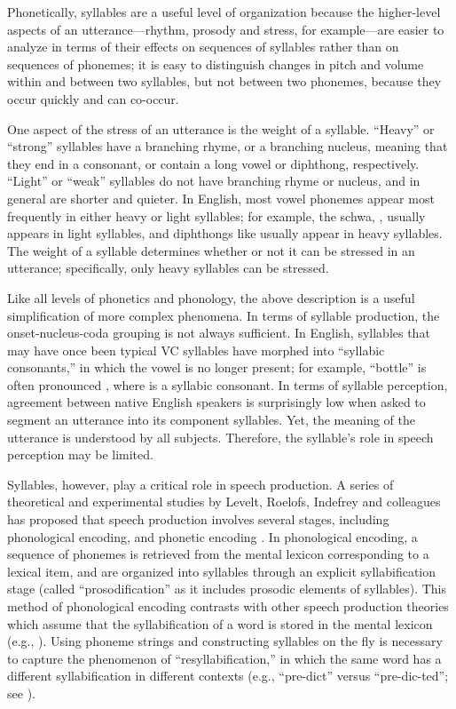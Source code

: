Phonetically, syllables are a useful
level of organization because
the higher-level aspects
of an utterance---rhythm, prosody and stress,
for example---are easier to analyze
in terms of their effects on
sequences of syllables rather than
on sequences of phonemes;
it is easy to distinguish
changes in pitch and volume
within and between two syllables,
but not between two phonemes,
because they occur quickly
and can co-occur.

One aspect of the stress of an utterance
is the weight of a syllable.
``Heavy'' or ``strong'' syllables
have a branching rhyme,
or a branching nucleus,
meaning that they
end in a consonant,
or contain a long vowel or diphthong,
respectively.
``Light'' or ``weak'' syllables
do not have branching rhyme or nucleus,
and in general are shorter
and quieter.
In English, most vowel phonemes
appear most frequently in either
heavy or light syllables;
for example, the schwa, \ipa{[@]},
usually appears in light syllables,
and diphthongs like \ipa{[aU]}
usually appear in heavy syllables.
The weight of a syllable determines
whether or not it can be stressed
in an utterance;
specifically, only heavy syllables
can be stressed.

Like all levels of phonetics and phonology,
the above description is a useful simplification
of more complex phenomena.
In terms of syllable production,
the onset-nucleus-coda grouping
is not always sufficient.
In English, syllables that may have once
been typical VC syllables have morphed
into ``syllabic consonants,'' in which
the vowel is no longer present;
for example, ``bottle'' is often
pronounced \ipa{[b6tl]},
where \ipa{[l]} is a syllabic consonant.
In terms of syllable perception,
agreement between native English speakers
is surprisingly low when
asked to segment an utterance
into its component syllables.
Yet, the meaning of the utterance
is understood by all subjects.
Therefore, the syllable's
role in speech perception may be limited.

Syllables, however, play a critical role
in speech production.
A series of theoretical and experimental studies
by Levelt, Roelofs, Indefrey and colleagues
has proposed that speech production
involves several stages,
including phonological encoding,
and phonetic encoding
\citep{levelt1999,roelofs2000,cholin2004,indefrey2004,indefrey2011}.
In phonological encoding,
a sequence of phonemes is retrieved
from the mental lexicon corresponding
to a lexical item,
and are organized into syllables
through an explicit syllabification stage
(called ``prosodification'' as it
includes prosodic elements of syllables).
This method of phonological encoding
contrasts with other speech production theories
which assume that the syllabification
of a word is stored in the mental lexicon
(e.g., \citealt{dell1988}).
Using phoneme strings and constructing
syllables on the fly
is necessary to capture
the phenomenon of ``resyllabification,''
in which the same word
has a different syllabification
in different contexts
(e.g., ``pre-dict'' versus
``pre-dic-ted'';
see \citealt{cholin2004}).

